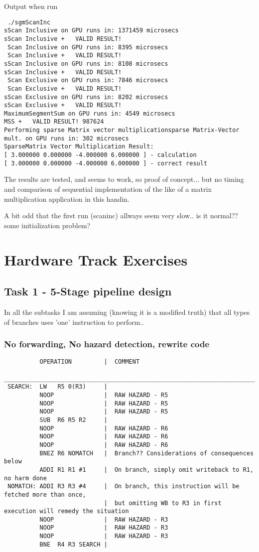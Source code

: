 \documentclass[a4paper,10pt]{article}
\begin{document}
\vfill
Output when run
\begin{verbatim}
 ./sgmScanInc
sScan Inclusive on GPU runs in: 1371459 microsecs
sScan Inclusive +   VALID RESULT!
 Scan Inclusive on GPU runs in: 8395 microsecs
 Scan Inclusive +   VALID RESULT!
sScan Inclusive on GPU runs in: 8108 microsecs
sScan Inclusive +   VALID RESULT!
 Scan Exclusive on GPU runs in: 7846 microsecs
 Scan Exclusive +   VALID RESULT!
sScan Exclusive on GPU runs in: 8202 microsecs
sScan Exclusive +   VALID RESULT!
MaximumSegmentSum on GPU runs in: 4549 microsecs
MSS +   VALID RESULT! 987624
Performing sparse Matrix vector multiplicationsparse Matrix-Vector mult. on GPU runs in: 302 microsecs
SparseMatrix Vector Multiplication Result:
[ 3.000000 0.000000 -4.000000 6.000000 ] - calculation
[ 3.000000 0.000000 -4.000000 6.000000 ] - correct result
\end{verbatim}
\vfill
The results are tested, and seems to work, so proof of concept... but no timing and comparison of sequential implementation of the like of a matrix multiplication application in this handin.

A bit odd that the first run (scaninc) allways seem very slow.. is it normal?? some initialization problem? 



\newpage

\section{Hardware Track Exercises}
\subsection{Task 1 - 5-Stage pipeline design}
In all the subtasks I am assuming (knowing it is a modified truth) that all types of branches uses 'one' instruction to perform..

\subsubsection{No forwarding, No hazard detection, rewrite code}
\begin{verbatim}
          OPERATION         |  COMMENT
 ________________________________________________________________________________________________
 SEARCH:  LW   R5 0(R3)     |
          NOOP              |  RAW HAZARD - R5
          NOOP              |  RAW HAZARD - R5
          NOOP              |  RAW HAZARD - R5
          SUB  R6 R5 R2     |
          NOOP              |  RAW HAZARD - R6
          NOOP              |  RAW HAZARD - R6
          NOOP              |  RAW HAZARD - R6
          BNEZ R6 NOMATCH   |  Branch?? Considerations of consequences below
          ADDI R1 R1 #1     |  On branch, simply omit writeback to R1, no harm done
 NOMATCH: ADDI R3 R3 #4     |  On branch, this instruction will be fetched more than once,
                            |  but omitting WB to R3 in first execution will remedy the situation
          NOOP              |  RAW HAZARD - R3
          NOOP              |  RAW HAZARD - R3
          NOOP              |  RAW HAZARD - R3
          BNE  R4 R3 SEARCH |
\end{verbatim}
\end{document}
